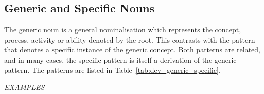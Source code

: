 \documentclass[grammar]{subfiles}
\begin{document}
  \subsection{Generic and Specific Nouns}
  \label{ssec:dev_generic_nouns}

  The generic noun is a general nominalisation which represents the concept, process, activity or ability denoted by the root. 
  This contrasts with the pattern that denotes a specific instance of the generic concept. 
  Both patterns are related, and in many cases, the specific pattern is itself a derivation of the generic pattern. 
  The patterns are listed in Table~\ref{tab:dev_generic_specific}.

  \begin{table}[htpb]\small\capstart
    \caption{Generic and specific noun forms\label{tab:dev_generic_specific}}
  \end{table}

  \begin{exe}
    \ex \emph{EXAMPLES}
  \end{exe}
\end{document}
